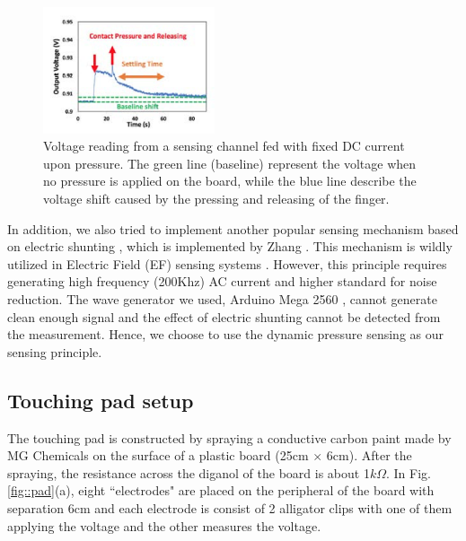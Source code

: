 \documentclass[reprint,amsmath, amsfonts, amssymb, aps, letterpaper]{revtex4-1}
\begin{document}
\begin{figure}[h]
\centering
    \includegraphics[width=0.45\textwidth]{./figure/pressure}     
       \caption{Voltage reading from a sensing channel fed with fixed DC current upon pressure. The green line (baseline) represent the voltage when no pressure is applied on the board, while the blue line describe the voltage shift caused by the pressing and releasing of the finger. \citep{isoft} }
    \label{fig::pressure}
\end{figure}

In addition, we also tried to implement another popular sensing mechanism based on electric shunting \cite{shunt}, which is implemented by Zhang \cite{electrick}. This mechanism is wildly utilized in Electric Field (EF) sensing systems \cite{ef}. However, this principle requires generating high frequency (200Khz) AC current and higher standard for noise reduction. The wave generator we used, Arduino Mega 2560 \citep{arduino}, cannot generate clean enough signal and the effect of electric shunting cannot be detected from the measurement. Hence, we choose to use the dynamic pressure sensing as our sensing principle.
\subsection{Touching pad setup}
The touching pad is constructed by spraying a conductive carbon paint made by MG Chemicals \citep{carbon} on the surface of a plastic board (25cm $\times$ 6cm). After the spraying, the resistance across the diganol of the board is about 1$\si{k \Omega}$. In Fig. \ref{fig::pad}(a), eight ``electrodes" are placed on the peripheral of the board with separation 6cm and each electrode is consist of 2 alligator clips with one of them applying the voltage and the other measures the voltage. 
\end{document}
